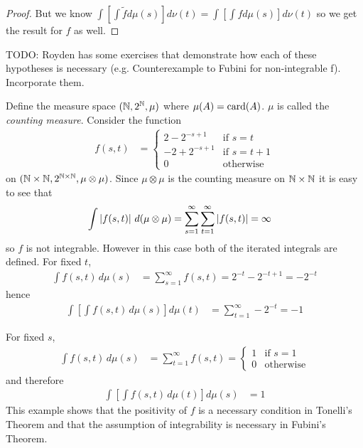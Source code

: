 \begin{proof}
But we know $\int \left [ \int \tilde{f} d\mu(s)\right ] d \nu(t) =
\int \left [ \int f d\mu(s)\right ] d \nu(t)$ so we get the result for
$f$ as well.
\end{proof}

TODO: Royden has some exercises that demonstrate how each of these
hypotheses is necessary (e.g. Counterexample to Fubini for
non-integrable f).  Incorporate them.
\begin{examp}Define the measure space $(\mathbb{N}, 2^{\mathbb{N}},
  \mu)$ where $\mu(A) = \operatorname*{card}(A)$.  $\mu$ is called the \emph{counting
    measure}.  
Consider the function 
\begin{align*}
f(s,t) &= \begin{cases}
2 - 2^{-s+1} & \text{if $s=t$}\\
-2 + 2^{-s+1} & \text{if $s = t + 1$} \\
0 & \text{otherwise}
\end{cases}
\end{align*}
on $(\mathbb{N} \times \mathbb{N}, 2^{\mathbb{N} \times \mathbb{N}}, \mu
\otimes \mu)$.  Since $\mu \otimes \mu$ is the counting measure on
$\mathbb{N} \times \mathbb{N}$ it is easy to see that 
\begin{align*}
\int \left \vert f(s,t) \right \vert \, d ( \mu \otimes \mu) &= \sum_{s=1}^\infty
\sum_{t=1}^\infty \left \vert f(s,t) \right \vert = \infty
\end{align*}
so $f$ is not integrable.  However in this case both of the iterated
integrals are defined.
For fixed $t$, 
\begin{align*}
\int f(s,t) \, d\mu(s) &=
\sum_{s=1}^\infty f(s,t) = 2^{-t} - 2^{-t+1} = -2^{-t}
\end{align*}
hence 
\begin{align*}
\int \left [ \int f(s,t) \, d\mu(s) \right ] d \mu(t) &=
\sum_{t=1}^\infty -2^{-t} = -1
\end{align*}

For fixed $s$, 
\begin{align*}
\int f(s,t) \, d\mu(s) &=
\sum_{t=1}^\infty f(s,t) = \begin{cases}
1 & \text {if $s=1$}\\
0 & \text {otherwise}
\end{cases}
\end{align*}
and therefore 
\begin{align*}
\int \left [ \int f(s,t) \, d\mu(t) \right ] d \mu(s) &= 1
\end{align*}
This example shows that the positivity of $f$ is a necessary condition
in Tonelli's Theorem and that the assumption of integrability is
necessary in Fubini's Theorem.
\end{examp}


